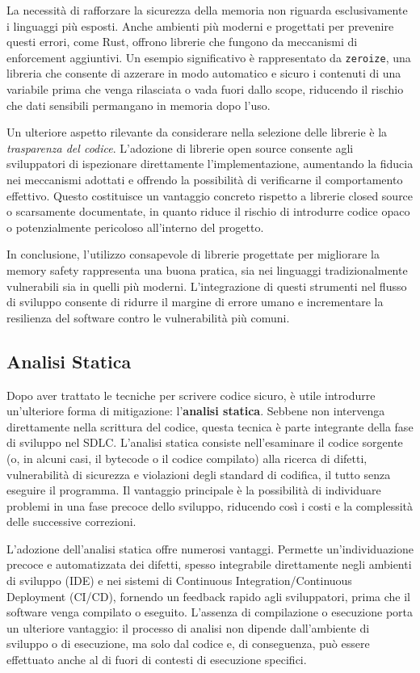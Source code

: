 La necessità di rafforzare la sicurezza della memoria non riguarda esclusivamente
i linguaggi più esposti. Anche ambienti più moderni e progettati per prevenire
questi errori, come Rust, offrono librerie che fungono da meccanismi di
enforcement aggiuntivi. Un esempio significativo è rappresentato da \texttt{zeroize},
una libreria che consente di azzerare in modo automatico e sicuro i contenuti di
una variabile prima che venga rilasciata o vada fuori dallo scope, riducendo il
rischio che dati sensibili permangano in memoria dopo l'uso.

Un ulteriore aspetto rilevante da considerare nella selezione delle librerie è
la \textit{trasparenza del codice}. L'adozione di librerie open source consente
agli sviluppatori di ispezionare direttamente l'implementazione, aumentando la fiducia
nei meccanismi adottati e offrendo la possibilità di verificarne il comportamento
effettivo. Questo costituisce un vantaggio concreto rispetto a librerie closed
source o scarsamente documentate, in quanto riduce il rischio di introdurre codice
opaco o potenzialmente pericoloso all'interno del progetto.

In conclusione, l'utilizzo consapevole di librerie progettate per migliorare la
memory safety rappresenta una buona pratica, sia nei linguaggi tradizionalmente vulnerabili
sia in quelli più moderni. L'integrazione di questi strumenti nel flusso di
sviluppo consente di ridurre il margine di errore umano e incrementare la
resilienza del software contro le vulnerabilità più comuni.

\subsection{Analisi Statica}
\label{sec:analisi-statica}

Dopo aver trattato le tecniche per scrivere codice sicuro, è utile introdurre un'ulteriore
forma di mitigazione: l'\textbf{analisi statica}. Sebbene non intervenga direttamente
nella scrittura del codice, questa tecnica è parte integrante della fase di
sviluppo nel SDLC. L'analisi statica consiste nell'esaminare il codice sorgente (o,
in alcuni casi, il bytecode o il codice compilato) alla ricerca di difetti,
vulnerabilità di sicurezza e violazioni degli standard di codifica, il tutto senza
eseguire il programma. Il vantaggio principale è la possibilità di individuare
problemi in una fase precoce dello sviluppo, riducendo così i costi e la complessità
delle successive correzioni.

L'adozione dell'analisi statica offre numerosi vantaggi. Permette un'individuazione
precoce e automatizzata dei difetti, spesso integrabile direttamente negli ambienti
di sviluppo (IDE) e nei sistemi di Continuous Integration/Continuous Deployment (CI/CD),
fornendo un feedback rapido agli sviluppatori, prima che il software venga compilato
o eseguito. L'assenza di compilazione o esecuzione porta un ulteriore vantaggio:
il processo di analisi non dipende dall'ambiente di sviluppo o di esecuzione, ma
solo dal codice e, di conseguenza, può essere effettuato anche al di fuori di
contesti di esecuzione specifici.

